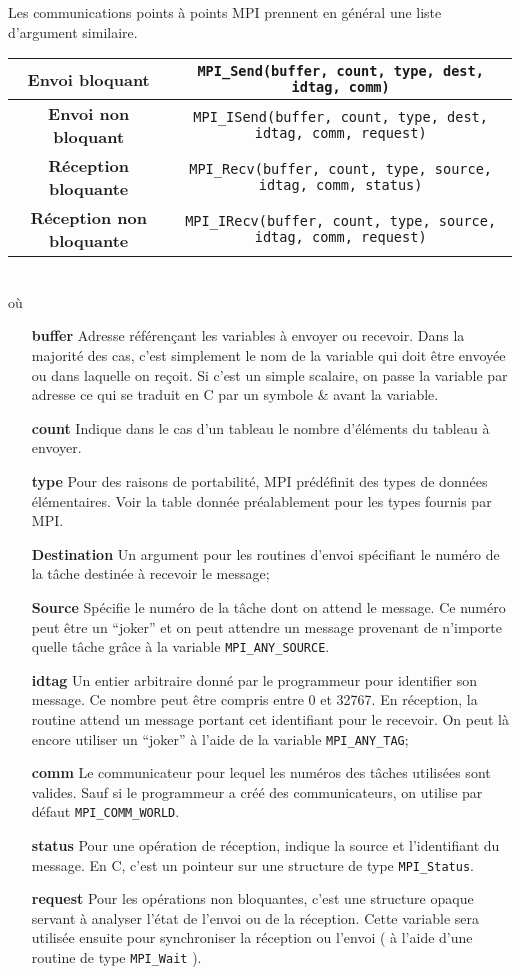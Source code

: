 \documentclass[11pt,a4paper]{article}
\begin{document}
Les communications points à points MPI prennent en général une liste d'argument similaire.\\
{\small
\begin{tabular}{|c|c|}\hline
\textbf{Envoi bloquant} & \texttt{MPI\_Send(buffer, count, type, dest, idtag, comm)} \\ \hline
\textbf{Envoi non bloquant} & \texttt{MPI\_ISend(buffer, count, type, dest, idtag, comm, request)} \\ \hline
\textbf{Réception bloquante} & \texttt{MPI\_Recv(buffer, count, type, source, idtag, comm, status)} \\ \hline
\textbf{Réception non bloquante} & \texttt{MPI\_IRecv(buffer, count, type, source, idtag, comm, request)} \\ \hline
\end{tabular}
}\\
où
\begin{itemize}
\item[{\bf buffer}] Adresse référençant les variables à envoyer ou recevoir. Dans la majorité des cas, c'est simplement le nom
de la variable qui doit être envoyée ou dans laquelle on reçoit. Si c'est un simple scalaire, on passe la variable par adresse
ce qui se traduit en C par un symbole \& avant la variable.
\item[{\bf count}] Indique dans le cas d'un tableau le nombre d'éléments du tableau à envoyer.
\item[{\bf type}]  Pour des raisons de portabilité, MPI prédéfinit des types de données élémentaires. Voir la table donnée préalablement
pour les types fournis par MPI.
\item[{\bf Destination}] Un argument pour les routines d'envoi spécifiant le numéro de la tâche destinée à recevoir le message;
\item[{\bf Source}] Spécifie le numéro de la tâche dont on attend le message. Ce numéro peut être un ``joker'' et on peut attendre un message
provenant de n'importe quelle tâche grâce à la variable \texttt{MPI\_ANY\_SOURCE}.
\item[{\bf idtag}] Un entier arbitraire donné par le programmeur pour identifier son message. Ce nombre peut être compris entre 0
et 32767. En réception, la routine attend un message portant cet identifiant pour le recevoir. On peut là encore utiliser un ``joker''
à l'aide de la variable \texttt{MPI\_ANY\_TAG};
\item[{\bf comm}] Le communicateur pour lequel les numéros des tâches utilisées sont valides. Sauf si le programmeur a créé des communicateurs,
on utilise par défaut \texttt{MPI\_COMM\_WORLD}.
\item[{\bf status}] Pour une opération de réception, indique la source et l'identifiant du message. En C, c'est un pointeur sur une structure
de type \texttt{MPI\_Status}. 
\item[{\bf request}] Pour les opérations non bloquantes, c'est une structure opaque servant à analyser l'état de l'envoi ou de la réception.
Cette variable sera utilisée ensuite pour synchroniser la réception ou l'envoi ( à l'aide d'une routine de type \texttt{MPI\_Wait} ).
\end{itemize}
\end{document}
